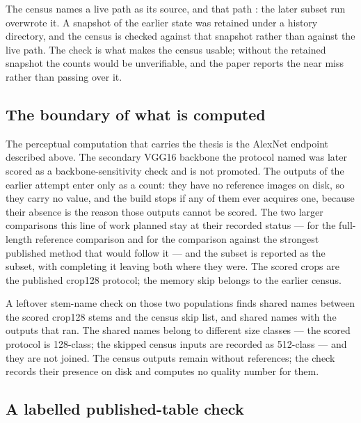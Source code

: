 The census names a live path as its source, and that path \CensusPathState{}:
the later subset run overwrote it. A snapshot of the earlier state was retained
under a history directory, and the census is checked against that snapshot
rather than against the live path. The check is what makes the census usable;
without the retained snapshot the counts would be unverifiable, and the paper
reports the near miss rather than passing over it.

\subsection{The boundary of what is computed}

The perceptual computation that carries the thesis is the AlexNet endpoint
described above. The secondary VGG16 backbone the protocol named was later
scored as a backbone-sensitivity check and is not promoted. The \CensusRan{} outputs of the earlier attempt enter only as a
count: they have no reference images on disk, so they carry no value, and the
build stops if any of them ever acquires one, because their absence is the
reason those outputs cannot be scored. The two larger comparisons this line of
work planned stay at their recorded status --- \PrimaryTier{} for the
full-length reference comparison and \SotaTier{} for the comparison against the
strongest published method that would follow it --- and the subset is reported
as the subset, with completing it leaving both where they were. The scored
\SubsetN{} crops are the published crop128 protocol; the memory skip belongs to
the earlier census.

A leftover stem-name check on those two populations finds
\CensusNameOverlap{} shared names between the scored crop128 stems and the
census skip list, and \CensusNameOverlapRan{} shared names with the
\CensusRan{} outputs that ran. The shared names belong to different size
classes --- the scored protocol is 128-class; the skipped census inputs are
recorded as 512-class --- and they are not joined. The \OrphanStems{} census
outputs remain without references; the check records their presence on disk
and computes no quality number for them.

\subsection{A labelled published-table check}

